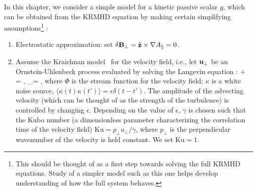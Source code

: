 %
    In this chapter, we consider a simple model for a kinetic passive scalar $g$, which
    can be obtained from the KRMHD equation by making certain simplifying
    assumptions\footnote{This should be thought of as a first step towards solving the
    full KRMHD equations. Study of a simpler model such as this one helps develop understanding of
    how the full system behaves.} :
    \begin{enumerate}
        \item Electrostatic approximation: set $\delta \mathbf{B}_\perp = \hat{\mathbf{z}} \times
        \nabla A_\parallel = 0$.

        \item Assume the Kraichnan model~\cite{kraichnan94} for the velocity field, i.e.,
        let $\mathbf{u}_\perp$ be an Ornstein-Uhlenbeck process
        \cite{uhlenbeck30, chandrasekhar43, wang45, vankampen92,
        gardiner86, gillespie91, gillespie96, reif09} evaluated by solving the Langevin
        equation \cite{langevin1908}:
        \beq
             + \gamma \Phi = \kappa, \quad {}_\perp =
            \times\nabla\Phi,
        \eeq
        where $\Phi$ is the stream function for the velocity field; $\kappa$
        is a white noise source, $\langle \kappa(t)\kappa(t')\rangle = \epsilon
        \delta(t-t')$. The amplitude of the advecting velocity (which can be thought of as
        the strength of the turbulence) is controlled by changing
        $\epsilon$. Depending on the value of $\epsilon$, $\gamma$ is chosen such that the
        Kubo number (a dimensionless parameter characterizing the correlation time of the
        velocity field) $\text{Ku}=p_\perp u_\perp/\gamma$, where $p_\perp$ is the
        perpendicular wavenumber of the velocity is held constant. We set $\text{Ku}=1$.
        

\end{enumerate}
